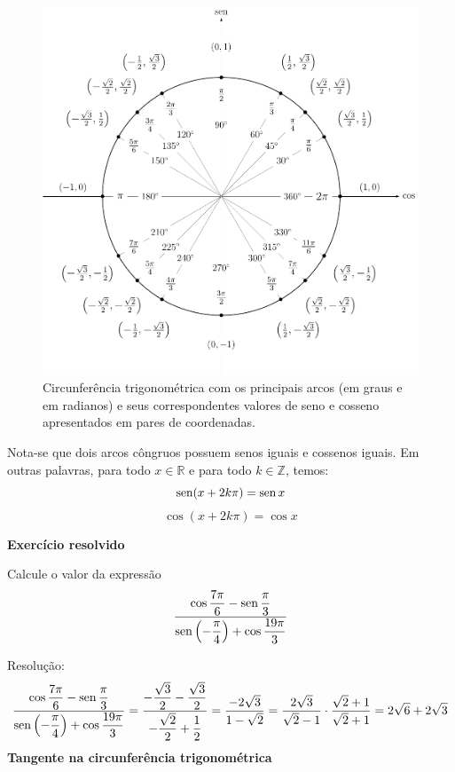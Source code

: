 \begin{figure}[h]
        \centering
        \includegraphics[width=\textwidth]{Imagens/fig05_circtrigcompl.pdf}
        \caption{Circunferência trigonométrica com os principais arcos (em graus e em radianos) e seus correspondentes valores de seno e cosseno apresentados em pares de coordenadas.}
        \label{fig:fig05_circtrigcompl}
 \end{figure}

Nota-se que dois arcos côngruos possuem senos iguais e cossenos iguais. Em outras palavras, para todo $x \in \mathbb{R}$ e para todo $k \in \mathbb{Z}$, temos:
\[
\operatorname{sen} (x + 2 k \pi) = \operatorname{sen} x
\]
\[
\cos (x + 2 k \pi) = \cos x
\]

\noindent
\textbf{Exercício resolvido} 

Calcule o valor da expressão
\[
\dfrac{\cos \dfrac{7 \pi}{6}-\operatorname{sen} \dfrac{\pi}{3}}{\operatorname{sen} \left(-\dfrac{\pi}{4}\right) + \cos \dfrac{19 \pi}{3}}
\]

\noindent
Resolução:
\[
\dfrac{\cos \dfrac{7 \pi}{6}-\operatorname{sen} \dfrac{\pi}{3}}{\operatorname{sen} \left(-\dfrac{\pi}{4}\right) + \cos \dfrac{19 \pi}{3}} = \dfrac{- \dfrac{\sqrt{3}}{2} - \dfrac{\sqrt{3}}{2}}{- \dfrac{\sqrt{2}}{2} + \dfrac{1}{2}} = \dfrac{- 2 \sqrt{3}}{1 - \sqrt{2}} = \dfrac{ 2 \sqrt{3}}{\sqrt{2}-1} \cdot \dfrac{\sqrt{2}+1}{\sqrt{2}+1} = 2 \sqrt{6} + 2 \sqrt{3}
\]
\textbf{Tangente na circunferência trigonométrica}

